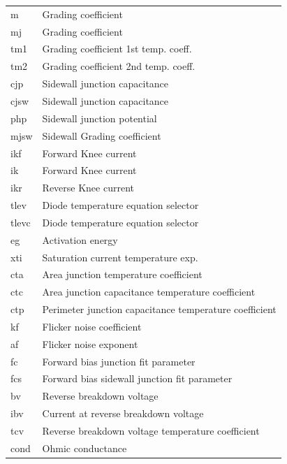 \begin{longtable}{l l}
																					{\small m} & {\small Grading coefficient} \\
																					{\small mj} & {\small Grading coefficient} \\
																					{\small tm1} & {\small Grading coefficient 1st temp. coeff.} \\
																					{\small tm2} & {\small Grading coefficient 2nd temp. coeff.} \\
																					{\small cjp} & {\small Sidewall junction capacitance} \\
																					{\small cjsw} & {\small Sidewall junction capacitance} \\
																					{\small php} & {\small Sidewall junction potential} \\
																					{\small mjsw} & {\small Sidewall Grading coefficient} \\
																					{\small ikf} & {\small Forward Knee current} \\
																					{\small ik} & {\small Forward Knee current} \\
																					{\small ikr} & {\small Reverse Knee current} \\
																					{\small tlev} & {\small Diode temperature equation selector} \\
																					{\small tlevc} & {\small Diode temperature equation selector} \\
																					{\small eg} & {\small Activation energy} \\
																					{\small xti} & {\small Saturation current temperature exp.} \\
																					{\small cta} & {\small Area junction temperature coefficient} \\
																					{\small ctc} & {\small Area junction capacitance temperature coefficient} \\
																					{\small ctp} & {\small Perimeter junction capacitance temperature coefficient} \\
																					{\small kf} & {\small Flicker noise coefficient} \\
																					{\small af} & {\small Flicker noise exponent} \\
																					{\small fc} & {\small Forward bias junction fit parameter} \\
																					{\small fcs} & {\small Forward bias sidewall junction fit parameter} \\
																					{\small bv} & {\small Reverse breakdown voltage} \\
																					{\small ibv} & {\small Current at reverse breakdown voltage} \\
																					{\small tcv} & {\small Reverse breakdown voltage temperature coefficient} \\
																					{\small cond} & {\small Ohmic conductance} 
\end{longtable}																				

